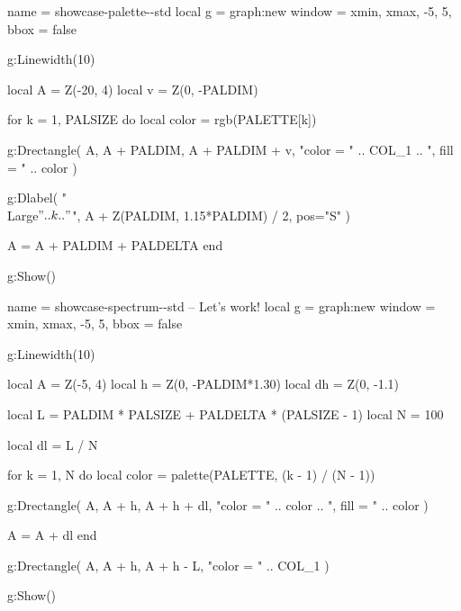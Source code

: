 





{\Huge\bfseries\PALETTE\vphantom{g}}



\bigskip

\begin{luadraw}{name = showcase-palette-\PALETTE-std}
local g = graph:new{
  window = {xmin, xmax, -5, 5},
  bbox   = false
}

g:Linewidth(10)

local A = Z(-20, 4)
local v = Z(0, -PALDIM)

for k = 1, PALSIZE do
  local color = rgb(PALETTE[k])

  g:Drectangle(
    A, A + PALDIM, A + PALDIM + v,
    "color = " .. COL_1 .. ", fill = " .. color
  )

  g:Dlabel(
    "\\Large$" .. k .. "$",
    A + Z(PALDIM, 1.15*PALDIM) / 2,
    {pos="S"}
  )

  A = A + PALDIM + PALDELTA
end

g:Show()
\end{luadraw}



\bigskip

\begin{luadraw}{name = showcase-spectrum-\PALETTE-std}
-- Let's work!
local g = graph:new{
  window = {xmin, xmax, -5, 5},
  bbox   = false
}

g:Linewidth(10)

local A  = Z(-5, 4)
local h  = Z(0, -PALDIM*1.30)
local dh = Z(0, -1.1)

local L = PALDIM * PALSIZE + PALDELTA * (PALSIZE - 1)
local N = 100

local dl = L / N

for k = 1, N do
  local color = palette(PALETTE, (k - 1) / (N - 1))

  g:Drectangle(
    A, A + h, A + h + dl,
    "color = " .. color .. ", fill = " .. color
  )

  A = A + dl
end

g:Drectangle(
  A, A + h, A + h - L,
  "color = " .. COL_1
)

g:Show()
\end{luadraw}


